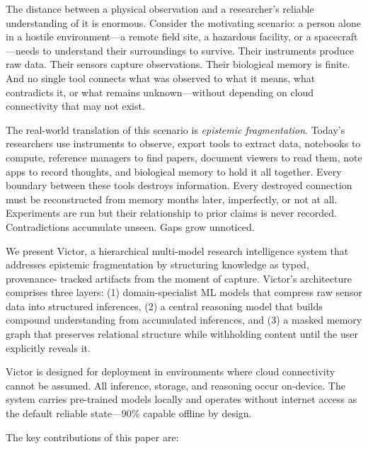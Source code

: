 \documentclass[letterpaper]{article}          %
\theoremstyle{plain}
\theoremstyle{definition}
\theoremstyle{remark}
\begin{document}
The distance between a physical observation and a researcher's reliable
understanding of it is enormous. Consider the motivating scenario: a person alone
in a hostile environment---a remote field site, a hazardous facility, or a
spacecraft---needs to understand their surroundings to survive. Their instruments
produce raw data. Their sensors capture observations. Their biological memory is
finite. And no single tool connects what was observed to what it means, what
contradicts it, or what remains unknown---without depending on cloud connectivity
that may not exist.

The real-world translation of this scenario is \emph{epistemic fragmentation}.
Today's researchers use instruments to observe, export tools to extract data,
notebooks to compute, reference managers to find papers, document viewers to read
them, note apps to record thoughts, and biological memory to hold it all together.
Every boundary between these tools destroys information. Every destroyed
connection must be reconstructed from memory months later, imperfectly, or not at
all. Experiments are run but their relationship to prior claims is never recorded.
Contradictions accumulate unseen. Gaps grow unnoticed.

We present Victor, a hierarchical multi-model research intelligence system that
addresses epistemic fragmentation by structuring knowledge as typed, provenance-
tracked artifacts from the moment of capture. Victor's architecture comprises
three layers: (1) domain-specialist ML models that compress raw sensor data into
structured inferences, (2) a central reasoning model that builds compound
understanding from accumulated inferences, and (3) a masked memory graph that
preserves relational structure while withholding content until the user explicitly
reveals it.

Victor is designed for deployment in environments where cloud connectivity cannot
be assumed. All inference, storage, and reasoning occur on-device. The system
carries pre-trained models locally and operates without internet access as the
default reliable state---90\% capable offline by design.

The key contributions of this paper are:
\end{document}
